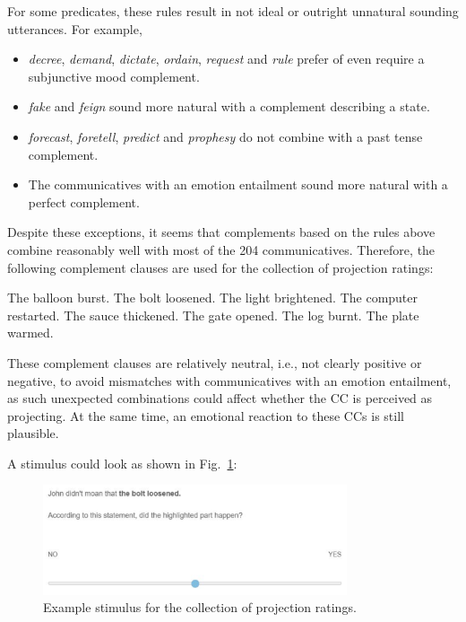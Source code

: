 \documentclass[11pt,fleqn]{article}
\newcommand{\figref}[1]{Fig.~\ref{#1}}
\newcommand{\6}{\mbox{$[\hspace*{-.6mm}[$}}
\newcommand{\9}{\mbox{$]\hspace*{-.6mm}]$}}
\begin{document}
For some predicates, these rules result in not ideal or outright unnatural sounding utterances. For example,
\begin{itemize}
	\item\emph{decree}, \emph{demand}, \emph{dictate}, \emph{ordain}, \emph{request} and \emph{rule} prefer of even require a subjunctive mood complement.
	\item \emph{fake} and \emph{feign} sound more natural with a complement describing a state.
	\item \emph{forecast}, \emph{foretell}, \emph{predict} and \emph{prophesy} do not combine with a past tense complement.
	\item The communicatives with an emotion entailment sound more natural with a perfect complement. 
\end{itemize}

Despite these exceptions, it seems that complements based on the rules above combine reasonably well with most of the 204 communicatives. Therefore, the following complement clauses are used for the collection of projection ratings:
\begin{exe}
	\ex
	\begin{xlist}
		\ex The balloon burst.
		\ex The bolt loosened.
		\ex The light brightened.
		\ex The computer restarted.
		\ex The sauce thickened.
		\ex The gate opened.
		\ex The log burnt.
		\ex The plate warmed.
		\ex 
		\ex
	\end{xlist}
\end{exe}

These complement clauses are relatively neutral, i.e., not clearly positive or negative, to avoid mismatches with communicatives with an emotion entailment, as such unexpected combinations could affect whether the CC is perceived as projecting. At the same time, an emotional reaction to these CCs is still plausible.

A stimulus could look as shown in \figref{exquest}:

\begin{figure}[H]
	\centering
	\includegraphics[width=0.8\textwidth]{example-question}
	\caption{Example stimulus for the collection of projection ratings.}
	\label{exquest}
\end{figure}
\end{document}
